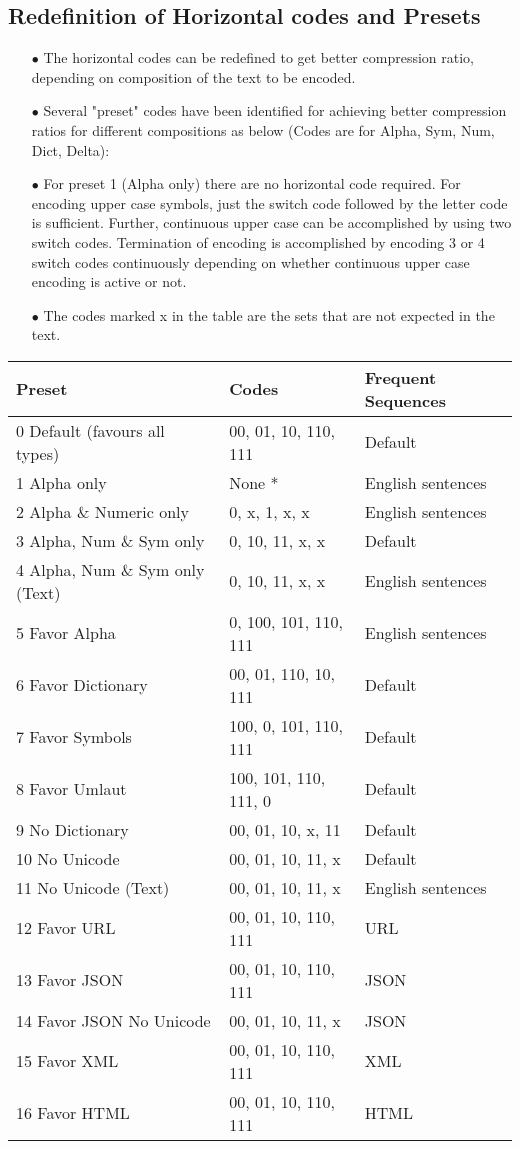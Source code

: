 \documentclass[]{article}
\begin{document}
\subsection{Redefinition of Horizontal codes and Presets}
\begin{itemize}
	\item[$\bullet$] The horizontal codes can be redefined to get better compression ratio, depending on composition of the text to be encoded.
	\item[$\bullet$] Several "preset" codes have been identified for achieving better compression ratios for different compositions as below (Codes are for Alpha, Sym, Num, Dict, Delta):
	\item[$\bullet$] For preset 1 (Alpha only) there are no horizontal code required. For encoding upper case symbols, just the switch code followed by the letter code is sufficient. Further, continuous upper case can be accomplished by using two switch codes. Termination of encoding is accomplished by encoding 3 or 4 switch codes continuously depending on whether continuous upper case encoding is active or not.
	\item[$\bullet$] The codes marked x in the table are the sets that are not expected in the text.
\end{itemize}
\begin{tabular}{ | l | l | l |} \hline
	﻿\textbf{Preset} & ﻿\textbf{Codes} & \textbf{Frequent Sequences} \\ \hline
	0 Default (favours all types) & 00, 01, 10, 110, 111 & Default \\ \hline
	1 Alpha only & None * & English sentences \\ \hline
	2 Alpha \& Numeric only & 0, x, 1, x, x & English sentences \\ \hline
	3 Alpha, Num \& Sym only & 0, 10, 11, x, x & Default \\ \hline
	4 Alpha, Num \& Sym only (Text) & 0, 10, 11, x, x & English sentences \\ \hline
	5 Favor Alpha & 0, 100, 101, 110, 111 & English sentences \\ \hline
	6 Favor Dictionary & 00, 01, 110, 10, 111 & Default \\ \hline
	7 Favor Symbols & 100, 0, 101, 110, 111 & Default \\ \hline
	8 Favor Umlaut & 100, 101, 110, 111, 0 & Default \\ \hline
	9 No Dictionary & 00, 01, 10, x, 11 & Default \\ \hline
	10 No Unicode & 00, 01, 10, 11, x & Default \\ \hline
	11 No Unicode (Text) & 00, 01, 10, 11, x & English sentences \\ \hline
	12 Favor URL & 00, 01, 10, 110, 111 & URL \\ \hline
	13 Favor JSON & 00, 01, 10, 110, 111 & JSON \\ \hline
	14 Favor JSON No Unicode & 00, 01, 10, 11, x & JSON \\ \hline
	15 Favor XML & 00, 01, 10, 110, 111 & XML \\ \hline
	16 Favor HTML & 00, 01, 10, 110, 111 & HTML \\ \hline
\end{tabular}
\end{document}

